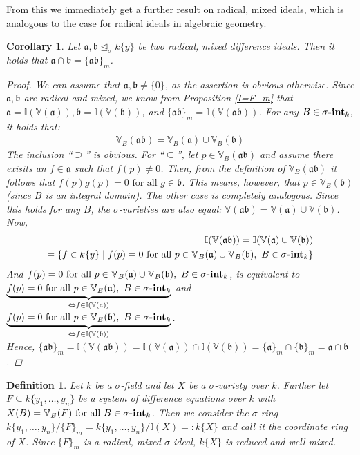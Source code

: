 \documentclass{article}
\def\I{\mathbb{I}}
\def\VV{\mathbb{V}}
\def\a{\mathfrak{a}}
\def\b{\mathfrak{b}}
\def\s{\sigma}
\def\si{\unlhd_{\sigma}}
\def\fa{\text{ for all }}
\newcommand{\catname}[1]{{\normalfont\textbf{#1}}}
\newcommand{\sintk}{\s\text{\catname{-int}}_k}
\newenvironment{bew}{\begin{proof}[Proof]}{\end{proof}}
\theoremstyle{plain}
\newtheorem{cor}[Satz]{Corollary}
\newtheorem{defn}[Satz]{Definition}
\theoremstyle{definition}
\begin{document}
From this we immediately get a further result on radical, mixed ideals, which is analogous to the case for radical ideals in algebraic geometry.
\begin{cor}\label{prod=cap}
Let $\a, \b \si k\{y\}$ be two radical, mixed difference ideals. Then it holds that $\a \cap \b = \{ \a \b \}_m$.
\begin{bew}
We can assume that $\a, \b \neq \{0\}$, as the assertion is obvious otherwise. Since $\a, \b$ are radical and mixed, we know from Proposition \ref{I=F_m} that $\a = \I(\VV(\a)), \b = \I(\VV(\b))$, and $\{ \a \b \}_m = \I( \VV( \a \b ))$.
For any $B \in \sintk$, it holds that:
\begin{align*} \VV_B( \a \b) = \VV_B( \a) \cup \VV_B( \b) \end{align*}
The inclusion ``$\supseteq$'' is obvious. For ``$\subseteq$'', let $p \in \VV_B(\a\b)$ and assume there exisits an $f \in \a$ such that $f(p) \neq 0$.
Then, from the definition of $\VV_B(\a\b)$ it follows that $f(p)g(p) = 0 \fa g \in \b$. This means, however, that $p \in \VV_B(\b)$ (since $B$ is an integral domain). The other case is completely analogous.
Since this holds for any $B$, the $\s$-varieties are also equal: $\VV( \a \b) = \VV( \a) \cup \VV( \b)$. Now,
\begin{align*} \I(\VV(\a \b)) = \I(\VV(\a) \cup \VV(\b)) \\ = \{ f \in k\{y\} \mid f(p) = 0 \fa p \in \VV_B(\a) \cup \VV_B(\b), ~ B \in \sintk \} \end{align*}
And $f(p) = 0 \fa p \in \VV_B(\a) \cup \VV_B(\b), ~ B \in \sintk$, is equivalent to \\
$ \underbrace{f(p) = 0 \fa p \in \VV_B(\a), ~ B \in \sintk}_{\Leftrightarrow f \in \I(\VV(\a))}$ and $ \underbrace{f(p) = 0 \fa p \in \VV_B(\b), ~ B \in \sintk}_{\Leftrightarrow f \in \I(\VV(\b))}$. \\
Hence, $\{\a\b\}_m = \I(\VV( \a \b)) = \I(\VV(\a)) \cap \I(\VV(\b)) = \{\a\}_m \cap \{\b\}_m = \a \cap \b$.
\end{bew}
\end{cor}

\begin{defn}
Let $k$ be a $\s$-field and let $X$ be a $\s$-variety over $k$. Further let $F \subseteq k\{y_1, \ldots, y_n\}$ be a system of difference equations over $k$ with $X(B) = \VV_B(F) \fa B \in \sintk$.
Then we consider the $\s$-ring $k\{y_1, \ldots, y_n\}/\{F\}_m = k\{y_1, \ldots, y_n\}/\I(X) =: k\{X\}$ and call it the \emph{coordinate ring} of $X$. Since $\{F\}_m$ is a radical, mixed $\s$-ideal, $k\{X\}$ is reduced and well-mixed. 
\end{defn}
\end{document}
